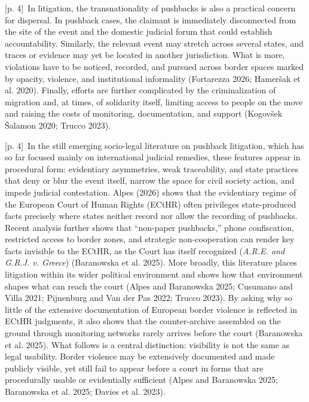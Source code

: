 \documentclass[10pt,a4paper]{article}
\begin{document}
{\scriptsize\color{gray} [p. 4]}\ In litigation, the transnationality of pushbacks is also a practical concern for dispersal. In pushback cases, the claimant is immediately disconnected from the site of the event and the domestic judicial forum that could establish accountability. Similarly, the relevant event may stretch across several states, and traces or evidence may yet be located in another jurisdiction. What is more, violations have to be noticed, recorded, and pursued across border spaces marked by opacity, violence, and institutional informality (Fortarezza 2026; Hameršak et al. 2020). Finally, efforts are further complicated by the criminalization of migration and, at times, of solidarity itself, limiting access to people on the move and raising the costs of monitoring, documentation, and support (Kogovšek Šalamon 2020; Trucco 2023).\par
{\scriptsize\color{gray} [p. 4]}\ In the still emerging socio-legal literature on pushback litigation, which has so far focused mainly on international judicial remedies, these features appear in procedural form: evidentiary asymmetries, weak traceability, and state practices that deny or blur the event itself, narrow the space for civil society action, and impede judicial contestation. Alpes (2026) shows that the evidentiary regime of the European Court of Human Rights (ECtHR) often privileges state-produced facts precisely where states neither record nor allow the recording of pushbacks. Recent analysis further shows that “non-paper pushbacks,” phone confiscation, restricted access to border zones, and strategic non-cooperation can render key facts invisible to the ECtHR, as the Court has itself recognized (\textit{A.R.E. and G.R.J. v. Greece}) (Baranowska et al. 2025). More broadly, this literature places litigation within its wider political environment and shows how that environment shapes what can reach the court (Alpes and Baranowska 2025; Cusumano and Villa 2021; Pijnenburg and Van der Pas 2022; Trucco 2023). By asking why so little of the extensive documentation of European border violence is reflected in ECtHR judgments, it also shows that the counter-archive assembled on the ground through monitoring networks rarely arrives before the court (Baranowska et al. 2025). What follows is a central distinction: visibility is not the same as legal usability. Border violence may be extensively documented and made publicly visible, yet still fail to appear before a court in forms that are procedurally usable or evidentially sufficient (Alpes and Baranowska 2025; Baranowska et al. 2025; Davies et al. 2023).\par
\end{document}
